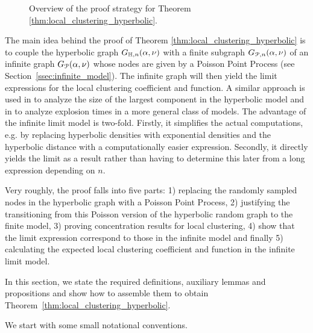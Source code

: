 \begin{figure}[!t]

\caption{Overview of the proof strategy for Theorem \ref{thm:local_clustering_hyperbolic}.}
\label{fig:overview_proof}
\end{figure}

The main idea behind the proof of Theorem \ref{thm:local_clustering_hyperbolic} is to couple the hyperbolic graph $G_{\mathbb{H}, n}(\alpha, \nu)$ with a finite subgraph $G_{{\mathcal P},n}(\alpha,\nu)$ of an infinite graph $G_{{\mathcal P}}(\alpha,\nu)$ whose nodes are given by a Poisson Point Process (see Section~\ref{ssec:infinite_model}). The infinite graph will then yield the limit expressions for the local clustering coefficient and function. A similar approach is used in \cite{fountoulakis2018law} to analyze the size of the largest component in the hyperbolic model and in \cite{komjathy2018explosion} to analyze explosion times in a more general class of models. 
The advantage of the infinite limit model is two-fold. Firstly, it simplifies the actual computations, e.g. by replacing hyperbolic densities with exponential densities and the hyperbolic distance with a computationally easier expression. Secondly, it directly yields the limit as a result rather than having to determine this later from a long expression depending on $n$. 

Very roughly, the proof falls into five parts: 1) replacing the randomly sampled nodes in the hyperbolic graph with a Poisson Point Process, 2) justifying the transitioning from this Poisson version of the hyperbolic random graph to the finite model, 3) proving concentration results for local clustering, 4) show that the limit expression correspond to those in the infinite model and finally 5) calculating the expected local clustering coefficient and function in the infinite limit model.
	
In this section, we state the required definitions, auxiliary lemmas and propositions and show how to assemble them to obtain Theorem~\ref{thm:local_clustering_hyperbolic}.

We start with some small notational conventions.

